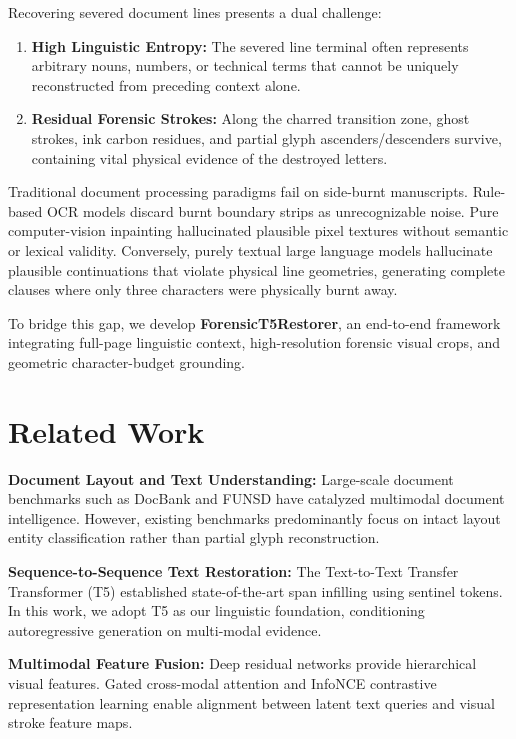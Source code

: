 \documentclass[10pt,twocolumn]{article}
\begin{document}
Recovering severed document lines presents a dual challenge:
\begin{enumerate}
    \item \textbf{High Linguistic Entropy:} The severed line terminal often represents arbitrary nouns, numbers, or technical terms that cannot be uniquely reconstructed from preceding context alone.
    \item \textbf{Residual Forensic Strokes:} Along the charred transition zone, ghost strokes, ink carbon residues, and partial glyph ascenders/descenders survive, containing vital physical evidence of the destroyed letters.
\end{enumerate}

Traditional document processing paradigms fail on side-burnt manuscripts. Rule-based OCR models \cite{levenshtein1966binary} discard burnt boundary strips as unrecognizable noise. Pure computer-vision inpainting hallucinated plausible pixel textures without semantic or lexical validity. Conversely, purely textual large language models hallucinate plausible continuations that violate physical line geometries, generating complete clauses where only three characters were physically burnt away.

To bridge this gap, we develop \textbf{ForensicT5Restorer}, an end-to-end framework integrating full-page linguistic context, high-resolution forensic visual crops, and geometric character-budget grounding.

\section{Related Work}
\textbf{Document Layout and Text Understanding:} Large-scale document benchmarks such as DocBank \cite{li2020docbank} and FUNSD \cite{jaume2019funsd} have catalyzed multimodal document intelligence. However, existing benchmarks predominantly focus on intact layout entity classification rather than partial glyph reconstruction.

\textbf{Sequence-to-Sequence Text Restoration:} The Text-to-Text Transfer Transformer (T5) \cite{raffel2020exploring} established state-of-the-art span infilling using sentinel tokens. In this work, we adopt T5 as our linguistic foundation, conditioning autoregressive generation on multi-modal evidence.

\textbf{Multimodal Feature Fusion:} Deep residual networks \cite{he2016deep} provide hierarchical visual features. Gated cross-modal attention \cite{vaswani2017attention} and InfoNCE contrastive representation learning \cite{oord2018representation,radford2021learning} enable alignment between latent text queries and visual stroke feature maps.
\end{document}

